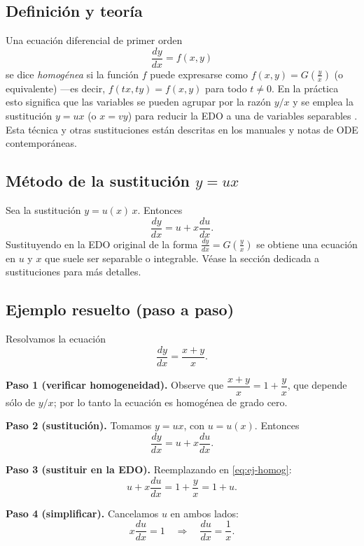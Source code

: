 \documentclass[stu]{apa7} %
\begin{document}
\subsection{Definición y teoría}
Una ecuación diferencial de primer orden
\[
\frac{dy}{dx} = f(x,y)
\]
se dice \emph{homogénea} si la función \(f\) puede expresarse como
\(f(x,y)=G\!\left(\frac{y}{x}\right)\) (o equivalente) —es decir, \(f(tx,ty)=f(x,y)\)
para todo \(t\neq 0\). En la práctica esto significa que las variables
se pueden agrupar por la razón \(y/x\) y se emplea la sustitución
\(y = u x\) (o \(x = v y\)) para reducir la EDO a una de variables
separables \parencite{kreyszig2011}. Esta técnica y otras sustituciones
están descritas en los manuales y notas de ODE contemporáneas. \parencite{apa_student_guide, apa7cls}

\subsection{Método de la sustitución \(y=ux\)}
Sea la sustitución \(y = u(x)\,x\). Entonces
\[
\frac{dy}{dx} = u + x\frac{du}{dx}.
\]
Sustituyendo en la EDO original de la forma \(\frac{dy}{dx}=G\!\left(\frac{y}{x}\right)\)
se obtiene una ecuación en \(u\) y \(x\) que suele ser separable o
integrable. Véase la sección dedicada a sustituciones para más detalles. \parencite{kreyszig2011, apa_student_guide}

\subsection{Ejemplo resuelto (paso a paso)}
Resolvamos la ecuación
\begin{equation}\label{eq:ej-homog}
\frac{dy}{dx} = \frac{x+y}{x}.
\end{equation}

\textbf{Paso 1 (verificar homogeneidad).} Observe que
\(\dfrac{x+y}{x}=1+\dfrac{y}{x}\), que depende sólo de \(y/x\); por lo
tanto la ecuación es homogénea de grado cero.

\textbf{Paso 2 (sustitución).} Tomamos \(y = u x\), con \(u = u(x)\).
Entonces
\[
\frac{dy}{dx} = u + x\frac{du}{dx}.
\]

\textbf{Paso 3 (sustituir en la EDO).} Reemplazando en
\eqref{eq:ej-homog}:
\[
u + x\frac{du}{dx} = 1 + \frac{y}{x} = 1 + u.
\]

\textbf{Paso 4 (simplificar).} Cancelamos \(u\) en ambos lados:
\[
x\frac{du}{dx} = 1 \quad\Longrightarrow\quad \frac{du}{dx} = \frac{1}{x}.
\]
\end{document}
